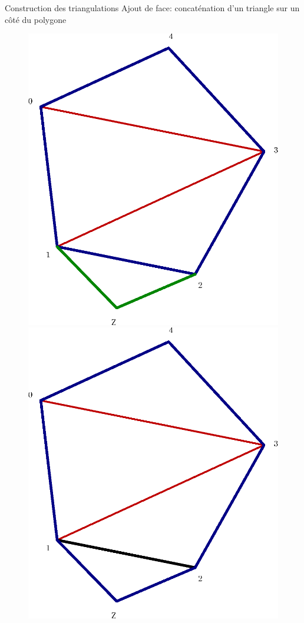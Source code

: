 \documentclass[french,xcolor=dvipsnames]{beamer}
\begin{document}
		\begin{frame}{Construction des triangulations}
			Ajout de face: concaténation d'un triangle sur un côté du polygone
			\begin{figure}
				\includegraphics[scale=0.3]{exemple_triangu_ajoute_face_debut.eps}
				\includegraphics[scale=0.3]{exemple_triangu_ajoute_face_fin.eps}

\end{figure}
\end{frame}
\end{document}
